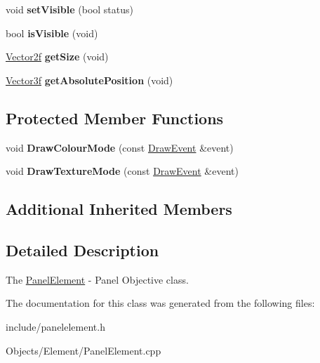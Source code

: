 \begin{DoxyCompactItemize}
\item 
\hypertarget{classEngine_1_1PanelElement_a2582648d9174faac9f8d87d764b544a6}{}void {\bfseries set\+Visible} (bool status)\label{classEngine_1_1PanelElement_a2582648d9174faac9f8d87d764b544a6}

\item 
\hypertarget{classEngine_1_1PanelElement_a85a14b7b78eaddb2732869364dd819f3}{}bool {\bfseries is\+Visible} (void)\label{classEngine_1_1PanelElement_a85a14b7b78eaddb2732869364dd819f3}

\item 
\hypertarget{classEngine_1_1PanelElement_a0ebbb68be1c35ac311b0eeb9cb236849}{}\hyperlink{classVector2}{Vector2f} {\bfseries get\+Size} (void)\label{classEngine_1_1PanelElement_a0ebbb68be1c35ac311b0eeb9cb236849}

\item 
\hypertarget{classEngine_1_1PanelElement_abd71d4ff65f77f5803caea19d5d985a2}{}\hyperlink{classVector3}{Vector3f} {\bfseries get\+Absolute\+Position} (void)\label{classEngine_1_1PanelElement_abd71d4ff65f77f5803caea19d5d985a2}

\end{DoxyCompactItemize}
\subsection*{Protected Member Functions}
\begin{DoxyCompactItemize}
\item 
\hypertarget{classEngine_1_1PanelElement_a5c13bf83c13fecf8bb2d82f7571df2f1}{}void {\bfseries Draw\+Colour\+Mode} (const \hyperlink{classEngine_1_1DrawEvent}{Draw\+Event} \&event)\label{classEngine_1_1PanelElement_a5c13bf83c13fecf8bb2d82f7571df2f1}

\item 
\hypertarget{classEngine_1_1PanelElement_aa3bd2c56fe19b4ea9f4f857d02723dbd}{}void {\bfseries Draw\+Texture\+Mode} (const \hyperlink{classEngine_1_1DrawEvent}{Draw\+Event} \&event)\label{classEngine_1_1PanelElement_aa3bd2c56fe19b4ea9f4f857d02723dbd}

\end{DoxyCompactItemize}
\subsection*{Additional Inherited Members}


\subsection{Detailed Description}
The \hyperlink{classEngine_1_1PanelElement}{Panel\+Element} -\/ Panel Objective class. 

The documentation for this class was generated from the following files\+:\begin{DoxyCompactItemize}
\item 
include/panelelement.\+h\item 
Objects/\+Element/Panel\+Element.\+cpp\end{DoxyCompactItemize}
